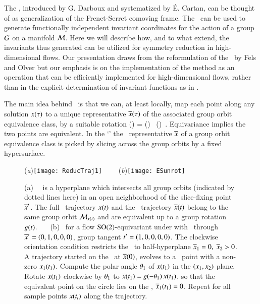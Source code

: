 The \mframes, introduced by G. Darboux and systematized by
\'E. Cartan, can be thought of as generalization
of the Frenet-Serret comoving frame. The \mframes\ can be
used to generate functionally independent invariant
coordinates for the action of a group $G$ on a manifold
${\cal M}$.  Here we will describe how, and to what extend, the
invariants thus generated can be utilized for symmetry
reduction in high-dimensional flows. Our presentation draws
from the reformulation of the \mframes\ by Fels and
Olver but our emphasis is on the
implementation of the method as an operation that can be
efficiently implemented for high-dimensional flows, rather
than in the explicit determination of invariant functions as
in .

The main idea behind \mframes\ is that we can, at least locally,
map each point along any solution $x(\tau)$ to a unique
representative $\overline{x}(\tau)$ of the associated
group orbit equivalence class, by a suitable rotation
\beq
\ssp(\tau) = \LieEl(\tau) \, \sspRed(\tau)
\,.
Equivariance implies the two points are equivalent.
In the `\mframes' the \reducedsp\ representative $\overline{x}$
of a group orbit equivalence class is picked by slicing across the group orbits
by a fixed hypersurface.
%
\begin{figure}[ht] \label{fig:ReducTraj}
\begin{center}
(\textit{a})\texttt{[image: ReducTraj1]}
~~~~(\textit{b})\texttt{[image: ESunrot]}
\end{center}
\caption{
(a)
\Slice\ \pSRed\ is a hyperplane  which intersects
all
group orbits (indicated by dotted lines here) in an open
neighborhood of the slice-fixing point ${\overline{x}'}$. The full
\statesp\ trajectory $x(t)$ and the \reducedsp\
trajectory $\overline{x}(t)$ belong to the same group orbit
${\cal M}_{x(t)}$ and are equivalent up to a group rotation
$g(t)$.
~~~(b)
\Mframes\ for a flow $\textrm{SO}(2)$-equivariant under
 with \slice\ through ${\overline{x}'}=(0,1,0,0,0)$,
group tangent $t'_{}=(1,0,0,0,0)$. The clockwise
orientation condition restricts the \slice\ to half-hyperplane
$\overline{x}_1=0,\;\overline{x}_2>0$. A trajectory started on the
\slice\ at $\overline{x}(0)$, evolves to a \statesp\ point with a
non-zero $x_1(t_1)$. Compute the polar angle ${\bf \theta}_1$
of $x(t_1)$ in the $(x_1,x_2)$ plane. Rotate $x(t_1)$
clockwise by ${\bf \theta}_1$ to $\overline{x}(t_1) =
g(-{\bf \theta}_1)\,x(t_1)$, so that the equivalent point
on the circle lies on the \slice, $\overline{x}_1(t_1) =0$. Repeat
for all sample points $x(t_i)$ along the trajectory.
}
\end{figure}
%

